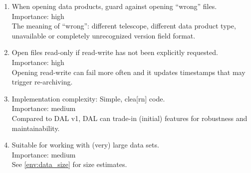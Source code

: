 \documentclass[a4paper,11pt]{article}
\begin{document}
\begin{enumerate}[label=\it R.\arabic{*}]
\item \label{req:guarded_fopen} When opening data products, guard against opening ``wrong'' files.\\
Importance: high\\
The meaning of ``wrong'': different telescope, different data product type, unavailable or completely unrecognized version field format.\\

\item \label{req:fopen_ro} Open files read-only if read-write has not been explicitly requested.\\
Importance: high\\
Opening read-write can fail more often and it updates timestamps that may trigger re-archiving.\\

\item \label{req:impl_complexity} Implementation complexity: Simple, clea[rn] code.\\
Importance: medium\\
Compared to DAL v1, DAL can trade-in (initial) features for robustness and maintainability.\\

\item \label{req:large_data} Suitable for working with (very) large data sets.\\
Importance: medium\\
See \ref{env:data_size} for size estimates.

\end{enumerate}
\end{document}
